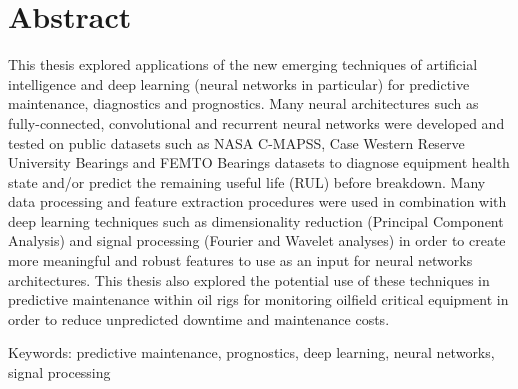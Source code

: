 \chapter*{Abstract}
\vspace{-2cm}
This thesis explored applications of the new emerging techniques of artificial intelligence and deep learning (neural networks in particular) for predictive maintenance, diagnostics and prognostics. Many neural architectures such as fully-connected, convolutional and recurrent neural networks were developed and tested on public datasets such as NASA C-MAPSS, Case Western Reserve University Bearings and FEMTO Bearings datasets to diagnose equipment health state and/or predict the remaining useful life (RUL) before breakdown. Many data processing and feature extraction procedures were used in combination with deep learning techniques such as dimensionality reduction (Principal Component Analysis) and signal processing (Fourier and Wavelet analyses) in order to create more meaningful and robust features to use as an input for neural networks architectures. This thesis also explored the potential use of these techniques in predictive maintenance within oil rigs for monitoring oilfield critical equipment in order to reduce unpredicted downtime and maintenance costs.

Keywords: predictive maintenance, prognostics, deep learning, neural networks, signal processing
